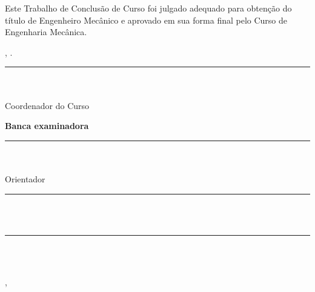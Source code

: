 \clearpage
\thispagestyle{empty}
\begin{center}
    {\normalsize \autorTCC\par}

    \vspace{1.5cm}
    {\bfseries\normalsize\MakeUppercase{\tituloTCC}\par}

    \vspace{1.5cm}
    Este Trabalho de Conclusão de Curso foi julgado adequado para obtenção do título de Engenheiro Mecânico e aprovado em sua forma final pelo Curso de Engenharia Mecânica.

    \vspace{0.8cm}
    \cidadeTCC, \dataDefesaTCC.

    \vspace{1.4cm}
    \rule{9cm}{0.4pt}\\
    \coordenadorTCC\\
    Coordenador do Curso

    \vspace{1.2cm}
    \textbf{Banca examinadora}

    \vspace{1.2cm}
    \rule{9cm}{0.4pt}\\
    \orientadorTCC\\
    Orientador

    \vspace{1.2cm}
    \rule{9cm}{0.4pt}\\
    \membroBancaUm\\
    \instituicaoBancaUm

    \vspace{1.2cm}
    \rule{9cm}{0.4pt}\\
    \membroBancaDois\\
    \instituicaoBancaDois

    \vfill
    \cidadeTCC, \anoTCC
\end{center}
\clearpage
